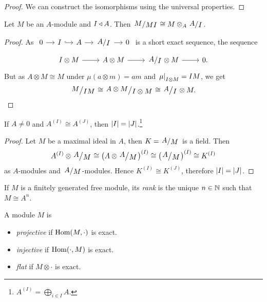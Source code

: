\begin{proof}
We can construct the isomorphisms using the universal properties.
\end{proof}


\begin{trditev}
Let $M$ be an $A$-module and $I \triangleleft A$. Then
$\kvoc{M}{MI} \cong M \otimes_A \kvoc{A}{I}$.
\end{trditev}

\begin{proof}
As
$\begin{tikzcd}[column sep=small]
0 \arrow[r] &
I \arrow[r, hook] &
A \arrow[r] &
\kvoc{A}{I} \arrow[r] &
0
\end{tikzcd}$
is a short exact sequence, the sequence
\[
\begin{tikzcd}
I \otimes M \arrow[r] &
A \otimes M \arrow[r] &
\kvoc{A}{I} \otimes M \arrow[r] &
0.
\end{tikzcd}
\]
But as $A \otimes M \cong M$ under $\mu(a \otimes m) = am$ and
$\left. \mu\right|_{I \otimes M}^{} = IM$, we get
\[
\kvoc{M}{IM} \cong
\kvoc{A \otimes M}{I \otimes M} \cong
\kvoc{A}{I} \otimes M. \qedhere
\]
\end{proof}

\begin{trditev}
If $A \ne 0$ and $A^{(I)} \cong A^{(J)}$, then
$\left\lvert I\right\rvert = \left\lvert J\right\rvert$.\footnote{
$\displaystyle A^{(I)} = \bigoplus_{i \in I} A$.}
\end{trditev}

\begin{proof}
Let $M$ be a maximal ideal in $A$, then $K = \kvoc{A}{M}$ is a
field. Then
\[
A^{(I)} \otimes \kvoc{A}{M} \cong
\br{A \otimes \kvoc{A}{M}}^{(I)} \cong
\br{\kvoc{A}{M}}^{(I)} \cong
K^{(I)}
\]
as $A$-modules and $\kvoc{A}{M}$-modules. Hence
$K^{(I)} \cong K^{(J)}$, therefore $\left\lvert I\right\rvert = \left\lvert J\right\rvert$.
\end{proof}

\begin{definicija}
If $M$ is a finitely generated free module, its
\emph{rank} is the unique $n \in \mathbb{N}$ such that
$M \cong A^n$.
\end{definicija}

\begin{definicija}
A module $M$ is

\begin{itemize}
\item \emph{projective} if
$\operatorname{Hom}(M, \cdot)$ is exact.
\item \emph{injective} if
$\operatorname{Hom}(\cdot, M)$ is exact.
\item \emph{flat} if $M \otimes \cdot$ is exact.
\end{itemize}
\end{definicija}

